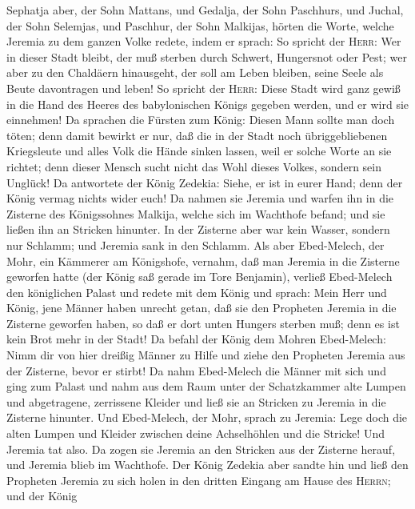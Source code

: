 Sephatja aber, der Sohn Mattans, und Gedalja, der Sohn
Paschhurs, und Juchal, der Sohn Selemjas, und Paschhur, der Sohn
Malkijas, hörten die Worte, welche Jeremia zu dem ganzen Volke redete,
indem er sprach:  So spricht der \textsc{Herr}: Wer in
dieser Stadt bleibt, der muß sterben durch Schwert, Hungersnot oder
Pest; wer aber zu den Chaldäern hinausgeht, der soll am Leben bleiben,
seine Seele als Beute davontragen und leben!  So spricht
der \textsc{Herr}: Diese Stadt wird ganz gewiß in die Hand des Heeres
des babylonischen Königs gegeben werden, und er wird sie einnehmen!
 Da sprachen die Fürsten zum König: Diesen Mann sollte man
doch töten; denn damit bewirkt er nur, daß die in der Stadt noch
übriggebliebenen Kriegsleute und alles Volk die Hände sinken lassen,
weil er solche Worte an sie richtet; denn dieser Mensch sucht nicht das
Wohl dieses Volkes, sondern sein Unglück!  Da antwortete
der König Zedekia: Siehe, er ist in eurer Hand; denn der König vermag
nichts wider euch!  Da nahmen sie Jeremia und warfen ihn
in die Zisterne des Königssohnes Malkija, welche sich im Wachthofe
befand; und sie ließen ihn an Stricken hinunter. In der Zisterne aber
war kein Wasser, sondern nur Schlamm; und Jeremia sank in den Schlamm.
 Als aber Ebed-Melech, der Mohr, ein Kämmerer am
Königshofe, vernahm, daß man Jeremia in die Zisterne geworfen hatte (der
König saß gerade im Tore Benjamin),  verließ Ebed-Melech
den königlichen Palast und redete mit dem König und sprach:
 Mein Herr und König, jene Männer haben unrecht getan, daß
sie den Propheten Jeremia in die Zisterne geworfen haben, so daß er dort
unten Hungers sterben muß; denn es ist kein Brot mehr in der Stadt!
 Da befahl der König dem Mohren Ebed-Melech: Nimm dir von
hier dreißig Männer zu Hilfe und ziehe den Propheten Jeremia aus der
Zisterne, bevor er stirbt!  Da nahm Ebed-Melech die
Männer mit sich und ging zum Palast und nahm aus dem Raum unter der
Schatzkammer alte Lumpen und abgetragene, zerrissene Kleider und ließ
sie an Stricken zu Jeremia in die Zisterne hinunter.  Und
Ebed-Melech, der Mohr, sprach zu Jeremia: Lege doch die alten Lumpen und
Kleider zwischen deine Achselhöhlen und die Stricke! Und Jeremia tat
also.  Da zogen sie Jeremia an den Stricken aus der
Zisterne herauf, und Jeremia blieb im Wachthofe.  Der
König Zedekia aber sandte hin und ließ den Propheten Jeremia zu sich
holen in den dritten Eingang am Hause des \textsc{Herrn}; und der König
